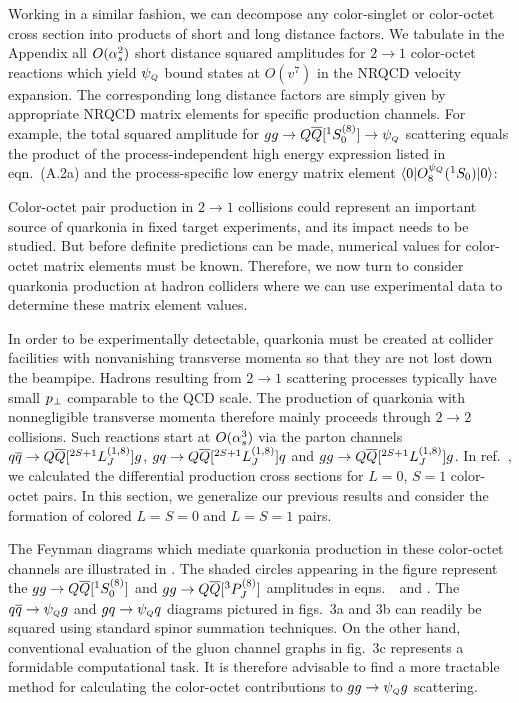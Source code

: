 	Working in a similar fashion, we can decompose any color-singlet or 
color-octet cross section into products of short and long distance factors.  We 
tabulate in the Appendix all $O(\alpha_s^2)$ short distance squared amplitudes for 
$2 \to 1$ color-octet reactions which yield $\psi_{\scriptscriptstyle Q}$ bound states 
at $O(v^7)$ in the NRQCD velocity expansion.  The corresponding long 
distance factors are simply given by appropriate NRQCD matrix elements for 
specific production channels.  For example, the total squared amplitude for 
$gg \to Q{\overline Q}[ ^1S_0^{(8)}] \to \psi_{\scriptscriptstyle Q}$ scattering equals the product of the 
process-independent high energy expression listed in eqn.~(A.2a) and the 
process-specific low energy matrix element 
$\langle 0 | O_8^{\psi_{\scriptscriptstyle Q}} ({}^1S_0) | 0 \rangle$:
%
\eqn{}
%

	Color-octet pair production in $2 \to 1$ collisions could represent an 
important source of quarkonia in fixed target experiments, and its impact 
needs to be studied.  But before definite predictions can be made, numerical 
values for color-octet matrix elements must be known.  Therefore, we now turn 
to consider quarkonia production at hadron colliders where we can use 
experimental data to determine these matrix element values.


	In order to be experimentally detectable, quarkonia must be created 
at collider facilities with nonvanishing transverse momenta so that they 
are not lost down the beampipe.  Hadrons resulting from $2 \to 1$ 
scattering processes typically have small $p_\perp$ comparable to the QCD scale.  
The production of quarkonia with nonnegligible transverse momenta therefore 
mainly proceeds through $2 \to 2$ collisions.   Such reactions start at 
$O(\alpha_s^3)$ via the parton channels $q{\overline q} \to Q{\overline Q}[ ^{2S+1}L_J^{(1,8)}] g$, 
$g q \to Q{\overline Q}[ ^{2S+1}L_J^{(1,8)}] q$ and $g g \to Q{\overline Q}[ ^{2S+1}L_J^{(1,8)}] g$.  In ref.~\ChoLeibov, 
we calculated the differential production cross sections for $L=0$, $S=1$ 
color-octet pairs.  In this section, we generalize our previous results and 
consider the formation of colored $L=S=0$ and $L=S=1$ pairs. 

	The Feynman diagrams which mediate quarkonia production in these 
color-octet channels are illustrated in \Twototwographs.  The shaded circles 
appearing in the figure represent the $gg \to Q{\overline Q}[ ^1S_0^{(8)}]$ and 
$gg \to Q{\overline Q}[ ^3P_J^{(8)}]$ amplitudes in eqns.~\ and 
.  The $q{\overline q} \to \psi_{\scriptscriptstyle Q} g$ and $g q \to \psi_{\scriptscriptstyle Q} q$ diagrams pictured in figs.~3a 
and 3b can readily be squared using standard spinor summation techniques. 
On the other hand, conventional evaluation of the gluon channel graphs 
in fig.~3c represents a formidable computational task.  It is therefore 
advisable to find a more tractable method for calculating the color-octet 
contributions to $g g \to \psi_{\scriptscriptstyle Q} g$ scattering.

